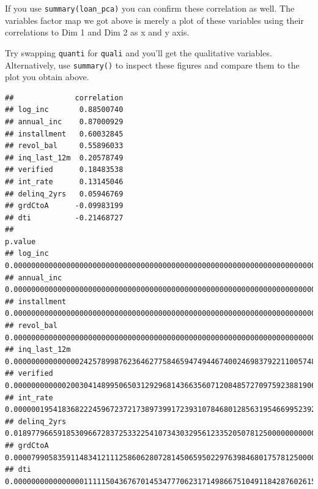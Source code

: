 \documentclass[]{article}
\newenvironment{Shaded}{\begin{snugshade}}{\end{snugshade}}
\newcommand{\DecValTok}[1]{\textcolor[rgb]{0.00,0.00,0.81}{#1}}
\newcommand{\KeywordTok}[1]{\textcolor[rgb]{0.13,0.29,0.53}{\textbf{#1}}}
\newcommand{\NormalTok}[1]{#1}
\newcommand{\OperatorTok}[1]{\textcolor[rgb]{0.81,0.36,0.00}{\textbf{#1}}}
\newcommand{\StringTok}[1]{\textcolor[rgb]{0.31,0.60,0.02}{#1}}
\begin{document}
If you use \texttt{summary(loan\_pca)} you can confirm these correlation
as well. The variables factor map we got above is merely a plot of these
variables using their correlations to Dim 1 and Dim 2 as x and y axis.

Try swapping \texttt{quanti} for \texttt{quali} and you'll get the
qualitative variables. Alternatively, use \texttt{summary()} to inspect
these figures and compare them to the plot you obtain above.

\begin{Shaded}
\end{Shaded}

\begin{verbatim}
##              correlation
## log_inc       0.88500740
## annual_inc    0.87000929
## installment   0.60032845
## revol_bal     0.55896033
## inq_last_12m  0.20578749
## verified      0.18483538
## int_rate      0.13145046
## delinq_2yrs   0.05946769
## grdCtoA      -0.09983199
## dti          -0.21468727
##                                                                                                                                                                        p.value
## log_inc      0.000000000000000000000000000000000000000000000000000000000000000000000000000000000000000000000000000000000000000000000000000000000000000000000000000000000000000
## annual_inc   0.000000000000000000000000000000000000000000000000000000000000000000000000000000000000000000000000000000000000000000000000000000000000000000000000000000000000000
## installment  0.000000000000000000000000000000000000000000000000000000000000000000000000000000000000000000000000000000000000000000000000000000000000000000000000000000005262153
## revol_bal    0.000000000000000000000000000000000000000000000000000000000000000000000000000000000000000000000000000000000000000000000000000000014129656050651152686817218399256
## inq_last_12m 0.000000000000000242578998762364627758465947494467400246983792211005748207242049829801544547080993652343750000000000000000000000000000000000000000000000000000000
## verified     0.000000000000200304148995065031292968143663560712084857270975923881906055612489581108093261718750000000000000000000000000000000000000000000000000000000000000000
## int_rate     0.000000195418368222459672372173897399172393107846801285631954669952392578125000000000000000000000000000000000000000000000000000000000000000000000000000000000000
## delinq_2yrs  0.018977966591853096672837253322541073430329561233520507812500000000000000000000000000000000000000000000000000000000000000000000000000000000000000000000000000000
## grdCtoA      0.000079905835911483412111258606280728145065950229763984680175781250000000000000000000000000000000000000000000000000000000000000000000000000000000000000000000000
## dti          0.000000000000000011111504367670145347770623171498667510491184287602615954337892389958142302930355072021484375000000000000000000000000000000000000000000000000000
\end{verbatim}
\end{document}
